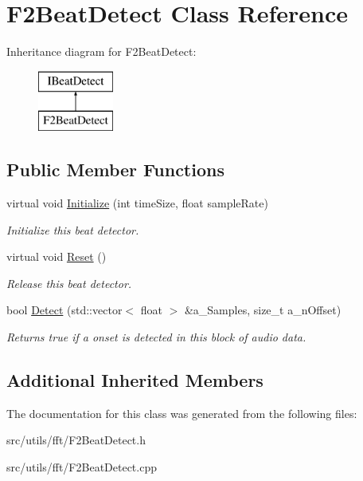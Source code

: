 \hypertarget{class_f2_beat_detect}{}\section{F2\+Beat\+Detect Class Reference}
\label{class_f2_beat_detect}
Inheritance diagram for F2\+Beat\+Detect\+:\begin{figure}[H]
\begin{center}
\leavevmode
\includegraphics[height=2.000000cm]{class_f2_beat_detect}
\end{center}
\end{figure}
\subsection*{Public Member Functions}
\begin{DoxyCompactItemize}
\item 
\mbox{\label{class_f2_beat_detect_ae727f17a85d525376aed6b8d22bfa9a4}} 
virtual void \hyperlink{class_f2_beat_detect_ae727f17a85d525376aed6b8d22bfa9a4}{Initialize} (int time\+Size, float sample\+Rate)
\begin{DoxyCompactList}\small\item\em Initialize this beat detector. \end{DoxyCompactList}\item 
\mbox{\label{class_f2_beat_detect_afca1254f1c9f4b866d08dc5afb5bf367}} 
virtual void \hyperlink{class_f2_beat_detect_afca1254f1c9f4b866d08dc5afb5bf367}{Reset} ()
\begin{DoxyCompactList}\small\item\em Release this beat detector. \end{DoxyCompactList}\item 
\mbox{\label{class_f2_beat_detect_a6a98eefb6041b575fba1d7255bb8491e}} 
bool \hyperlink{class_f2_beat_detect_a6a98eefb6041b575fba1d7255bb8491e}{Detect} (std\+::vector$<$ float $>$ \&a\+\_\+\+Samples, size\+\_\+t a\+\_\+n\+Offset)
\begin{DoxyCompactList}\small\item\em Returns true if a onset is detected in this block of audio data. \end{DoxyCompactList}\end{DoxyCompactItemize}
\subsection*{Additional Inherited Members}


The documentation for this class was generated from the following files\+:\begin{DoxyCompactItemize}
\item 
src/utils/fft/F2\+Beat\+Detect.\+h\item 
src/utils/fft/F2\+Beat\+Detect.\+cpp\end{DoxyCompactItemize}
